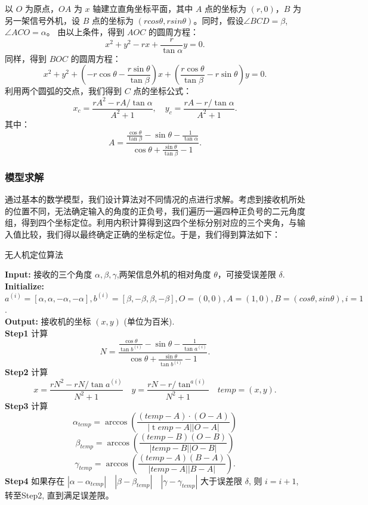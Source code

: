 \documentclass{my_paper}
\begin{document}
以 $O$ 为原点，$OA$ 为 $x$ 轴建立直角坐标平面，其中 $A$ 点的坐标为 $(r,0)$，$B$ 为另一架信号外机，设 $B$ 点的坐标为 $(rcos\theta,rsin\theta)$。同时，假设$\angle B C D = \beta$, $ \angle A C O = \alpha$。
由以上条件，得到 $AOC$ 的圆周方程：
$$
x ^ { 2 } + y ^ { 2 } - r x + \frac { r } { \tan \alpha } y = 0.
$$
同样，得到 $BOC$ 的圆周方程：
$$
x ^ { 2 } + y ^ { 2 } + ( - r \cos \theta - \frac { r \sin \theta } { \tan \beta } ) x + ( \frac { r \cos \theta } { \tan \beta } - r \sin \theta ) y = 0.
$$
利用两个圆弧的交点，我们得到 $C$ 点的坐标公式：
$$
x _ { c } = \frac { r A ^ { 2 } - r A / \tan \alpha } { A ^ { 2 } + 1 }, 
\quad y _ { c } = \frac { r A - r / \tan \alpha } { A ^ { 2 } + 1 }.
$$
其中：
$$
A = \frac { \frac { \cos \theta } { \tan \beta } - \sin \theta - \frac { 1 } { \tan \alpha } } { \cos \theta + \frac { \sin \theta } { \tan \beta } - 1 }.
$$

\subsubsection{模型求解}

通过基本的数学模型，我们设计算法对不同情况的点进行求解。考虑到接收机所处的位置不同，无法确定输入的角度的正负号，我们遍历一遍四种正负号的二元角度组，得到四个坐标定位。利用内积计算得到这四个坐标分别对应的三个夹角，与输入值比较，我们得以最终确定正确的坐标定位。于是，我们得到算法如下：

\begin{algorithm}[t]
\caption{\small 无人机定位算法}
\textbf{Input:} 接收的三个角度 $\alpha,\beta,\gamma$,两架信息外机的相对角度 $\theta$，可接受误差限 $\delta$.\\
\textbf{Initialize:} $a^{(i)} = [\alpha,\alpha,-\alpha,-\alpha],b ^{(i)}= [\beta,-\beta,\beta,-\beta],O=(0,0),A=(1,0),B=(cos\theta,sin\theta),i=1$.\\
\textbf{Output:} 接收机的坐标 $(x,y)$ (单位为百米). \\
\textbf{Step1} 计算 $$N = \frac { \frac { \cos \theta } { \tan b^{(i)} } - \sin \theta - \frac { 1 } { \tan a^{(i)} } } { \cos \theta + \frac { \sin \theta } { \tan b^{(i)} } - 1 }.$$
\textbf{Step2} 计算 $$x= \frac { r N ^ { 2 } - r N / \tan a^{(i)} } { N ^ { 2 } + 1 } \quad y = \frac { r N - r / \tan ^{a(i)} } { N ^ { 2 } + 1 }\quad temp=(x,y).$$
\textbf{Step3} 计算 $$\alpha _ { t e m p } = \arccos ( \frac { ( temp  - A ) \cdot ( O - A ) } { | \operatorname temp - A | | O - A | } )$$ $$\beta _{ temp} = \arccos ( \frac { ( temp - B ) ( O - B ) } { | temp - B | | O - B | } )$$ $$\gamma_ { temp } = \arccos ( \frac { ( temp - A ) ( B - A ) } { |  temp - A | | B - A | } ).$$
\textbf{Step4} 如果存在 $|\alpha-\alpha_{temp}|\quad|\beta-\beta_{temp}|\quad|\gamma-\gamma_{temp}|$ 大于误差限 $\delta$, 则 $i=i+1$, 转至Step2, 直到满足误差限。
\end{algorithm}
\end{document}
